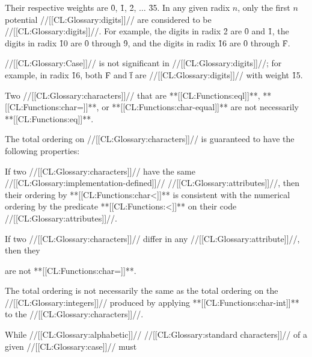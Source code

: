 Their respective weights are \f{0}, \f{1}, \f{2}, $\ldots$ \f{35}. In any given radix $n$, only the first $n$ potential //[[CL:Glossary:digits]]//  are considered to be //[[CL:Glossary:digits]]//. For example, the digits in radix \f{2}  are \f{0} and \f{1},  the digits in radix \f{10} are \f{0} through \f{9}, and the digits in radix \f{16} are \f{0} through \f{F}.

//[[CL:Glossary:Case]]// is not significant in //[[CL:Glossary:digits]]//;  for example, in radix \f{16}, both \f{F} and \f{f}  are //[[CL:Glossary:digits]]// with weight \f{15}.

\endsubsubsection%

\endsubSection%


Two //[[CL:Glossary:characters]]// that are **[[CL:Functions:eql]]**, **[[CL:Functions:char=]]**, or **[[CL:Functions:char-equal]]**  are not necessarily **[[CL:Functions:eq]]**.

\endsubSection%


The total ordering on //[[CL:Glossary:characters]]// is guaranteed to have  the following properties: 

\beginlist


\itemitem{\bull}  If two //[[CL:Glossary:characters]]// have the same //[[CL:Glossary:implementation-defined]]// //[[CL:Glossary:attributes]]//, then their ordering by **[[CL:Functions:char<]]** is consistent with the numerical ordering by the predicate **[[CL:Functions:<]]** on their code //[[CL:Glossary:attributes]]//.

\itemitem{\bull} If two //[[CL:Glossary:characters]]// differ in any //[[CL:Glossary:attribute]]//, then they

are not **[[CL:Functions:char=]]**.


\itemitem{\bull}
  The total ordering is not necessarily the same as the total ordering
  on the //[[CL:Glossary:integers]]// produced by applying **[[CL:Functions:char-int]]** to the
  //[[CL:Glossary:characters]]//.

 \itemitem{\bull} 
  While //[[CL:Glossary:alphabetic]]// //[[CL:Glossary:standard characters]]// of a given //[[CL:Glossary:case]]//
  must    

